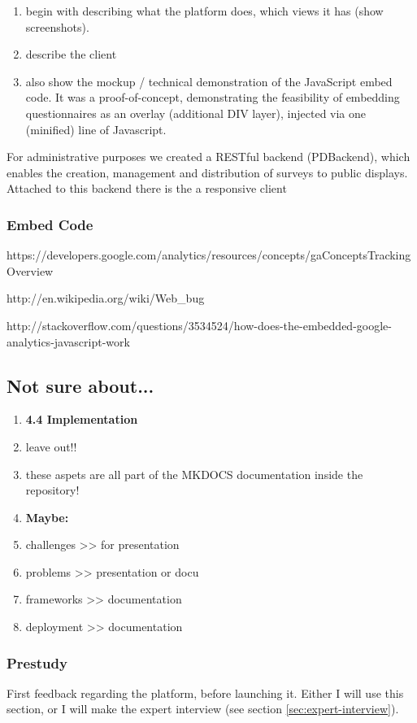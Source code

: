 	\begin{enumerate}
	\item begin with describing what the platform does, which views it has (show screenshots).
	\item describe the client
	\item also show the mockup / technical demonstration of the JavaScript embed code. It was a proof-of-concept, demonstrating the feasibility of embedding questionnaires as an overlay (additional DIV layer), injected via one (minified) line of Javascript. %
	\end{enumerate}


		For administrative purposes we created a RESTful backend (PDBackend), which enables the creation, management and distribution of surveys to public displays. Attached to this backend there is the   a responsive client 


	\subsubsection{Embed Code}

	https://developers.google.com/analytics/resources/concepts/gaConceptsTrackingOverview

	http://en.wikipedia.org/wiki/Web_bug

	http://stackoverflow.com/questions/3534524/how-does-the-embedded-google-analytics-javascript-work




\subsection{Not sure about...}

	\begin{enumerate}

	\item \textbf{4.4 Implementation}
		\item leave out!!
		\item these aspets are all part of the MKDOCS documentation inside the repository!

	\item \textbf{Maybe:}
		\item challenges		>> for presentation
		\item problems		>> presentation or docu
		\item frameworks 		>> documentation
		\item deployment		>> documentation

	\end{enumerate}


	\subsubsection{Prestudy}

	First feedback regarding the platform, before launching it. Either I will use this section, or I will make the expert interview (see section \ref{sec:expert-interview}).
